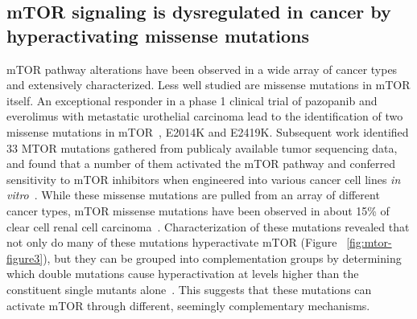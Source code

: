 \documentclass[phd,tocprelim]{cornell}
\begin{document}
\subsection{mTOR signaling is dysregulated in cancer by hyperactivating missense mutations}
mTOR pathway alterations have been observed in a wide array of cancer types~\citep{Guertin:2007dw} and extensively characterized. Less well studied are missense mutations in mTOR itself. An exceptional responder in a phase 1 clinical trial of pazopanib and everolimus with metastatic urothelial carcinoma lead to the identification of two missense mutations in mTOR~\citep{Wagle:2014ej}, E2014K and E2419K. Subsequent work identified 33 MTOR mutations gathered from publicaly available tumor sequencing data, and found that a number of them activated the mTOR pathway and conferred sensitivity to mTOR inhibitors when engineered into various cancer cell lines \emph{in vitro}~\citep{Grabiner:2014be}. While these missense mutations are pulled from an array of different cancer types, mTOR missense mutations have been observed in about 15\% of clear cell renal cell carcinoma~\citep{CancerGenomeAtlasResearchNetwork:2013ib}. Characterization of these mutations revealed that not only do many of these mutations hyperactivate mTOR (Figure ~\ref{fig:mtor-figure3}), but they can be grouped into complementation groups by determining which double mutations cause hyperactivation at levels higher than the constituent single mutants alone~\citep{Xu:2016fw}. This suggests that these mutations can activate mTOR through different, seemingly complementary mechanisms. 
\end{document}
